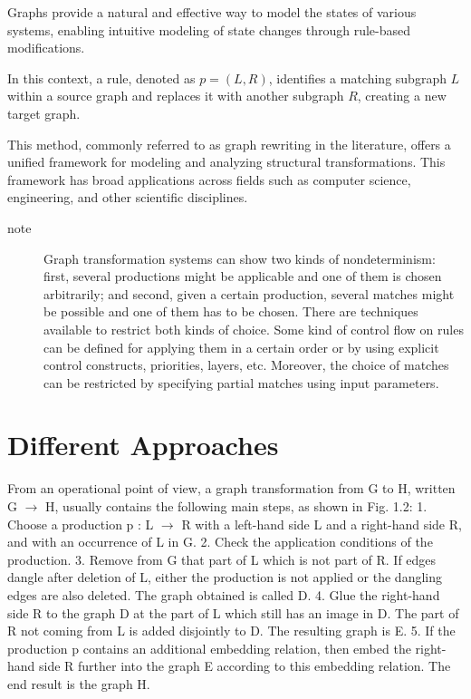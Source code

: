 Graphs provide a natural and effective way to model the states of various systems, enabling intuitive modeling of state changes through rule-based modifications. 

In this context, a rule, denoted as \(p = (L, R)\), identifies a matching subgraph \(L\) within a source graph and replaces it with another subgraph \(R\), creating a new target graph. 

This method, commonly referred to as graph rewriting in the literature, offers a unified framework for modeling and analyzing structural transformations. This framework has broad applications across fields such as computer science, engineering, and other scientific disciplines.

\begin{description}
    \item[note]Graph transformation systems can show two kinds of nondeterminism: first, several productions might be applicable and one of them is chosen arbitrarily; and second, given a certain production, several matches might be possible and one of them has to be chosen. There are techniques available to restrict both kinds of choice. Some kind of control flow on rules can be defined for applying them in a certain order or by using explicit control constructs, priorities, layers, etc. Moreover, the choice of matches can be restricted by specifying partial matches using input parameters.
\end{description}

 
\section{Different Approaches}

From an operational point of view, a graph transformation from G to H, written G $\to$ H, usually contains the following main steps, as shown in Fig. 1.2: 1. Choose a production p : L $\to$ R with a left-hand side L and a right-hand side R, and with an occurrence of L in G. 2. Check the application conditions of the production. 3. Remove from G that part of L which is not part of R. If edges dangle after deletion of L, either the production is not applied or the dangling edges are also deleted. The graph obtained is called D. 4. Glue the right-hand side R to the graph D at the part of L which still has an image in D. The part of R not coming from L is added disjointly to D. The resulting graph is E. 5. If the production p contains an additional embedding relation, then embed the right-hand side R further into the graph E according to this embedding relation. The end result is the graph H.

